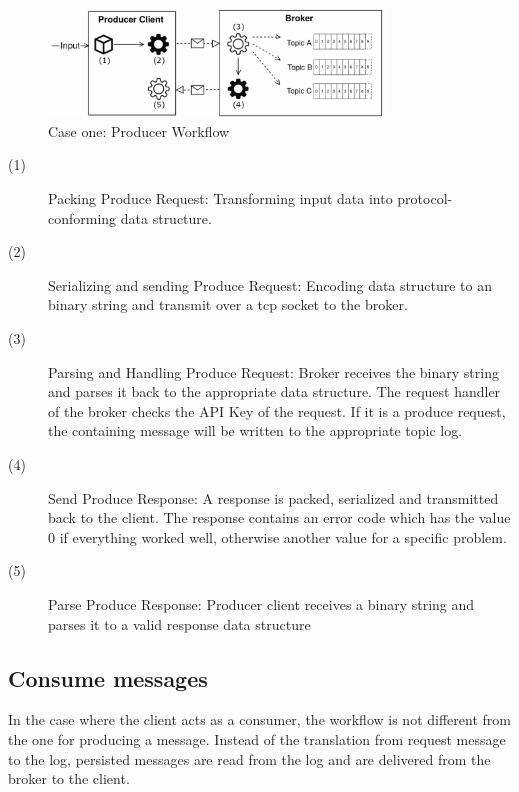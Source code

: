 \begin{figure}[H]
    \centering
    \includegraphics[width=0.8\textwidth]{images/concept_producer.png}
    \caption{Case one: Producer Workflow}
    \label{fig:conept-producer}
\end{figure}

\begin{description}
    \item [(1)] 
        {Packing Produce Request: Transforming input data into protocol-conforming data structure.}
    \item [(2)] 
        {Serializing and sending Produce Request: Encoding data structure to an
            binary  string and transmit over a tcp socket to the broker.}
    \item [(3)] 
        {Parsing and Handling Produce Request: Broker receives the binary string
            and parses it back to the appropriate data structure. The request
            handler of the  broker checks the API Key of the request. If it is a
            produce request, the containing message will be written to the
            appropriate topic log.}
    \item [(4)] 
        {Send Produce Response: A response is packed, serialized and transmitted
            back to the client. The response contains an error code which has
            the value 0 if everything worked well, otherwise another value for a
            specific problem. }
    \item [(5)] 
        {Parse Produce Response: Producer client receives a binary string and
            parses it to a valid response data structure }
\end{description}

\subsection{Consume messages}

In the case where the client acts as a consumer, the workflow is not different from the one for
producing a message. Instead of the translation from request message to the log, persisted messages
are read from the log and are delivered from the broker to the client.

